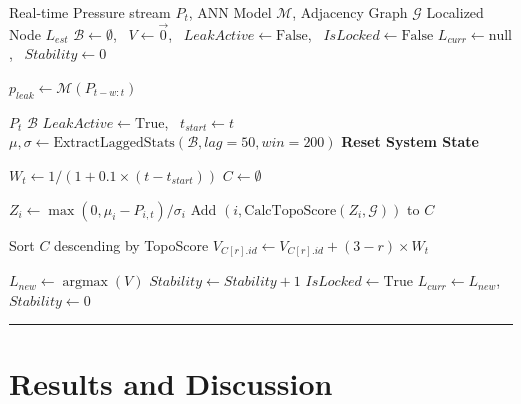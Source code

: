 \documentclass[final,5p,times,twocolumn,authoryear]{elsarticle}
\begin{document}
\begin{algorithmic}[1]
\Require Real-time Pressure stream $P_t$, ANN Model $\mathcal{M}$, Adjacency Graph $\mathcal{G}$
\Ensure Localized Node $L_{est}$
\State $\mathcal{B} \leftarrow \emptyset$, \ $V \leftarrow \vec{0}$, \ $LeakActive \leftarrow \text{False}$, \ $IsLocked \leftarrow \text{False}$
\State $L_{curr} \leftarrow \text{null}$, \ $Stability \leftarrow 0$

    \State $p_{leak} \leftarrow \mathcal{M}(P_{t-w:t})$
    
          $P_t$  $\mathcal{B}$ \EndIf
            \State $LeakActive \leftarrow \text{True}$, \ $t_{start} \leftarrow t$
            \State $\mu, \sigma \leftarrow \text{ExtractLaggedStats}(\mathcal{B}, lag=50, win=200)$
        \EndIf
    \Else
         \textbf{Reset System State} \EndIf
        
            \State $W_t \leftarrow 1 / (1 + 0.1 \times (t - t_{start}))$
            \State $C \leftarrow \emptyset$ 
            
                \State $Z_i \leftarrow \max(0, \mu_i - P_{i,t}) / \sigma_i$
                    \State Add $(i, \text{CalcTopoScore}(Z_i, \mathcal{G}))$ to $C$
                \EndIf
            \EndFor
            
            \State Sort $C$ descending by TopoScore
                \State $V_{C[r].id} \leftarrow V_{C[r].id} + (3 - r) \times W_t$
            \EndFor
            
            \State $L_{new} \leftarrow \operatorname*{argmax}(V)$
                \State $Stability \leftarrow Stability + 1$
                 $IsLocked \leftarrow \text{True}$ \EndIf
            \Else
                \State $L_{curr} \leftarrow L_{new}$, \ $Stability \leftarrow 0$
            \EndIf
        \EndIf
    \EndIf
\EndWhile
\end{algorithmic}

\noindent\rule{\columnwidth}{0.8pt}
\vspace{10pt}

\section{Results and Discussion}
\end{document}
